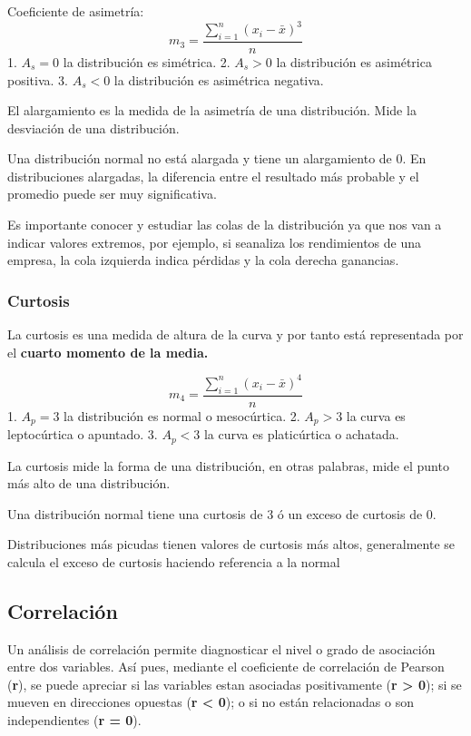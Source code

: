 \documentclass[
]{book}
\begin{document}
Coeficiente de asimetría:
\[m_3 = \frac{\sum_{i=1}^n (x_i - \bar{x})^3}{n}\]
1. \(A_s = 0\) la distribución es simétrica.
2. \(A_s >0\) la distribución es asimétrica positiva.
3. \(A_s <0\) la distribución es asimétrica negativa.

El alargamiento es la medida de la asimetría de una distribución. Mide la desviación de una distribución.

Una distribución normal no está alargada y tiene un alargamiento de 0. En distribuciones alargadas, la diferencia entre el resultado más probable y el promedio puede ser muy significativa.

Es importante conocer y estudiar las colas de la distribución ya que nos van a indicar valores extremos, por ejemplo, si seanaliza los rendimientos de una empresa, la cola izquierda indica pérdidas y la cola derecha ganancias.

\hypertarget{curtosis}{%
\subsubsection{Curtosis}\label{curtosis}}

La curtosis es una medida de altura de la curva y por tanto está representada por el \textbf{cuarto momento de la media.}

\[m_4 = \frac{\sum_{i=1}^n (x_i - \bar{x})^4}{n}\]
1. \(A_p = 3\) la distribución es normal o mesocúrtica.
2. \(A_p >3\) la curva es leptocúrtica o apuntado.
3. \(A_p <3\) la curva es platicúrtica o achatada.

La curtosis mide la forma de una distribución, en otras palabras, mide el punto más alto de una distribución.

Una distribución normal tiene una curtosis de 3 ó un exceso de curtosis de 0.

Distribuciones más picudas tienen valores de curtosis más altos, generalmente se calcula el exceso de curtosis haciendo referencia a la normal

\hypertarget{correlaciuxf3n}{%
\subsection{Correlación}\label{correlaciuxf3n}}

Un análisis de correlación permite diagnosticar el nivel o grado de asociación entre dos variables. Así pues, mediante el coeficiente de correlación de Pearson (\textbf{r}), se puede apreciar si las variables estan asociadas positivamente (\textbf{r \textgreater{} 0}); si se mueven en direcciones opuestas (\textbf{r \textless{} 0}); o si no están relacionadas o son independientes (\textbf{r = 0}).
\end{document}
